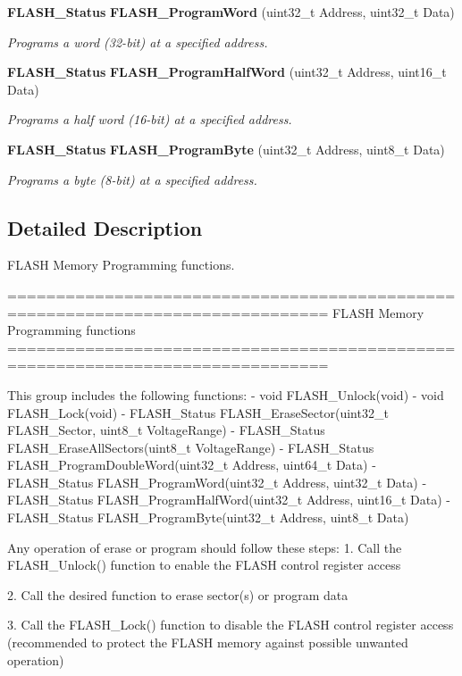 \begin{DoxyCompactItemize}
\textbf{ F\+L\+A\+S\+H\+\_\+\+Status} \textbf{ F\+L\+A\+S\+H\+\_\+\+Program\+Word} (uint32\+\_\+t Address, uint32\+\_\+t Data)
\begin{DoxyCompactList}\small\item\em Programs a word (32-\/bit) at a specified address. \end{DoxyCompactList}\item 
\textbf{ F\+L\+A\+S\+H\+\_\+\+Status} \textbf{ F\+L\+A\+S\+H\+\_\+\+Program\+Half\+Word} (uint32\+\_\+t Address, uint16\+\_\+t Data)
\begin{DoxyCompactList}\small\item\em Programs a half word (16-\/bit) at a specified address. \end{DoxyCompactList}\item 
\textbf{ F\+L\+A\+S\+H\+\_\+\+Status} \textbf{ F\+L\+A\+S\+H\+\_\+\+Program\+Byte} (uint32\+\_\+t Address, uint8\+\_\+t Data)
\begin{DoxyCompactList}\small\item\em Programs a byte (8-\/bit) at a specified address. \end{DoxyCompactList}\end{DoxyCompactItemize}


\subsection{Detailed Description}
F\+L\+A\+SH Memory Programming functions. 

\begin{DoxyVerb} ===============================================================================
                      FLASH Memory Programming functions
 ===============================================================================   

   This group includes the following functions:
    - void FLASH_Unlock(void)
    - void FLASH_Lock(void)
    - FLASH_Status FLASH_EraseSector(uint32_t FLASH_Sector, uint8_t VoltageRange)
    - FLASH_Status FLASH_EraseAllSectors(uint8_t VoltageRange)
    - FLASH_Status FLASH_ProgramDoubleWord(uint32_t Address, uint64_t Data)
    - FLASH_Status FLASH_ProgramWord(uint32_t Address, uint32_t Data)
    - FLASH_Status FLASH_ProgramHalfWord(uint32_t Address, uint16_t Data)
    - FLASH_Status FLASH_ProgramByte(uint32_t Address, uint8_t Data)
   
   Any operation of erase or program should follow these steps:
   1. Call the FLASH_Unlock() function to enable the FLASH control register access

   2. Call the desired function to erase sector(s) or program data

   3. Call the FLASH_Lock() function to disable the FLASH control register access
      (recommended to protect the FLASH memory against possible unwanted operation)\end{DoxyVerb}
 

